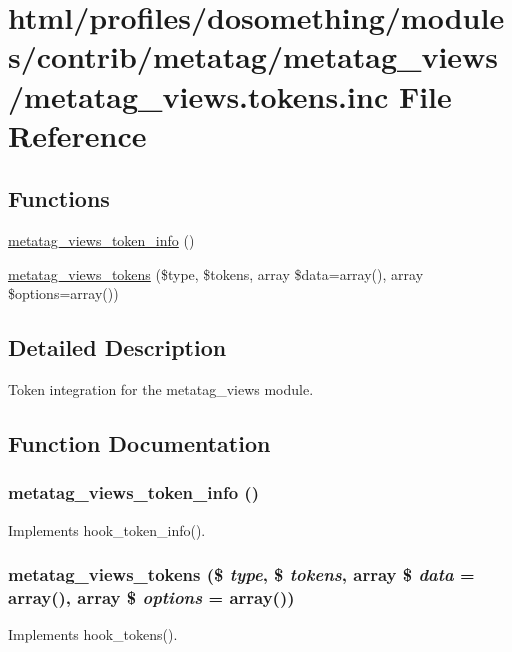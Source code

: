 \hypertarget{metatag__views_8tokens_8inc}{
\section{html/profiles/dosomething/modules/contrib/metatag/metatag\_\-views/metatag\_\-views.tokens.inc File Reference}
\label{metatag__views_8tokens_8inc}
}
\subsection*{Functions}
\begin{DoxyCompactItemize}
\item 
\hyperlink{metatag__views_8tokens_8inc_a8e88403fb36cbef254723b3c734d1cc0}{metatag\_\-views\_\-token\_\-info} ()
\item 
\hyperlink{metatag__views_8tokens_8inc_a1c0a87f4f1fc2e98bebe62e909b4affa}{metatag\_\-views\_\-tokens} (\$type, \$tokens, array \$data=array(), array \$options=array())
\end{DoxyCompactItemize}


\subsection{Detailed Description}
Token integration for the metatag\_\-views module. 

\subsection{Function Documentation}
\hypertarget{metatag__views_8tokens_8inc_a8e88403fb36cbef254723b3c734d1cc0}{
\subsubsection[{metatag\_\-views\_\-token\_\-info}]{\setlength{\rightskip}{0pt plus 5cm}metatag\_\-views\_\-token\_\-info ()}}
\label{metatag__views_8tokens_8inc_a8e88403fb36cbef254723b3c734d1cc0}
Implements hook\_\-token\_\-info(). \hypertarget{metatag__views_8tokens_8inc_a1c0a87f4f1fc2e98bebe62e909b4affa}{
\subsubsection[{metatag\_\-views\_\-tokens}]{\setlength{\rightskip}{0pt plus 5cm}metatag\_\-views\_\-tokens (\$ {\em type}, \/  \$ {\em tokens}, \/  array \$ {\em data} = {\ttfamily array()}, \/  array \$ {\em options} = {\ttfamily array()})}}
\label{metatag__views_8tokens_8inc_a1c0a87f4f1fc2e98bebe62e909b4affa}
Implements hook\_\-tokens(). 